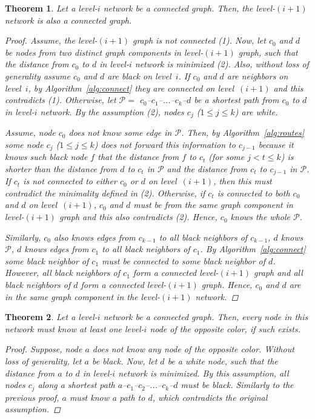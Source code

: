 \documentclass[conference]{IEEEtran}
\newtheorem{thm}{Theorem}
\theoremstyle{definition}
\newcommand{\cP}{{\mathcal{P}}}
\begin{document}
\begin{thm}
    Let a level-$i$ network be a connected graph. Then, the level-$(i+1)$ network is also a connected graph.

    \begin{proof}
        Assume, the level-$(i+1)$ graph is not connected (1). Now, let $c_0$ and $d$ be nodes from two distinct graph components in level-$(i+1)$ graph, such that the distance from $c_0$ to $d$ in level-$i$ network is minimized (2). Also, without loss of generality assume $c_0$ and $d$ are black on level~$i$. If $c_0$ and $d$ are neighbors on level~$i$, by Algorithm~\ref{alg:connect} they are connected on level~$(i+1)$ and this contradicts (1). Otherwise, let $\cP = $ $c_0$--$c_1$--...--$c_k$--$d$ be a shortest path from $c_0$ to $d$ in level-$i$ network. By the assumption (2), nodes $c_j$ ($1 \le j \le k$) are white.

        Assume, node $c_0$ does not know some edge in $\cP$. Then, by Algorithm~\ref{alg:routes} some node $c_j$ ($1 \le j \le k$) does not forward this information to $c_{j-1}$ because it knows such black node $f$ that the distance from $f$ to $c_t$ (for some $j < t \le k$) is shorter than the distance from $d$ to $c_t$ in $\cP$ and the distance from $c_t$ to $c_{j-1}$ in $\cP$. If $c_t$ is not connected to either $c_0$ or $d$ on level~$(i+1)$, then this must contradict the minimality defined in (2). Otherwise, if $c_t$ is connected to both $c_0$ and $d$ on level~$(i+1)$, $c_0$ and $d$ must be from the same graph component in level-$(i+1)$ graph and this also contradicts (2). Hence, $c_0$ knows the whole $\cP$. 
        
        Similarly, $c_0$ also knows edges from $c_{k-1}$ to all black neighbors of $c_{k-1}$, $d$ knows $\cP$, $d$ knows edges from $c_1$ to all black neighbors of $c_1$. By Algorithm~\ref{alg:connect} some black neighbor of $c_1$ must be connected to some black neighbor of $d$. However, all black neighbors of $c_1$ form a connected level-$(i+1)$ graph and all black neighbors of $d$ form a connected level-$(i+1)$ graph. Hence, $c_0$ and $d$ are in the same graph component in the level-$(i+1)$ network.
    \end{proof}

    \label{thm:connectivity-levels}
\end{thm}

\begin{thm}
    Let a level-$i$ network be a connected graph. Then, every node in this network must know at least one level-$i$ node of the opposite color, if such exists.

    \begin{proof}
        Suppose, node $a$ does not know any node of the opposite color. Without loss of generality, let $a$ be black. Now, let $d$ be a white node, such that the distance from $a$ to $d$ in level-$i$ network is minimized. By this assumption, all nodes $c_j$ along a shortest path $a$--$c_1$--$c_2$--...--$c_k$--$d$ must be black. Similarly to the previous proof, $a$ must know a path to $d$, which contradicts the original assumption.
    \end{proof}

    \label{thm:connectivity-colors}
\end{thm}
\end{document}
